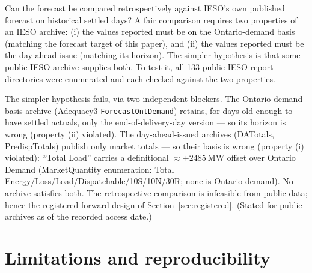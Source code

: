 Can the forecast be compared retrospectively against IESO's own
published forecast on historical settled days? A fair comparison
requires two properties of an IESO archive: (i) the values reported
must be on the Ontario-demand basis (matching the forecast target
of this paper), and (ii) the values reported must be the day-ahead
issue (matching its horizon). The simpler hypothesis is that some
public IESO archive supplies both. To test it, all 133 public IESO
report directories were enumerated and each checked against the two
properties.

The simpler hypothesis fails, via two independent blockers. The
Ontario-demand-basis archive (Adequacy3
\texttt{ForecastOntDemand}) retains, for days old enough to have
settled actuals, only the end-of-delivery-day version --- so its
horizon is wrong (property (ii) violated). The day-ahead-issued
archives (DATotals, PredispTotals) publish only market totals --- so
their basis is wrong (property (i) violated): ``Total Load'' carries
a definitional \(\approx +2485~\mathrm{MW}\) offset over Ontario
Demand (MarketQuantity enumeration: Total
Energy/Loss/Load/Dispatchable/10S/10N/30R; none is Ontario demand).
No archive satisfies both. The retrospective comparison is
infeasible from public data; hence the registered forward design
of Section~\ref{sec:registered}. (Stated for public archives as of
the recorded access date.)

\section{Limitations and reproducibility}
\label{sec:limits}

